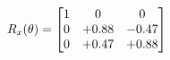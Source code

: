 \documentclass[preview]{standalone}
\begin{document}
\begin{align*}
\special{dvisvgm:raw <g id='unique000'>}R_{x}(\theta) = \begin{bmatrix}1 & 0 & 0 \\0 & +0.88 & -0.47 \\0 & +0.47 & +0.88\end{bmatrix}\special{dvisvgm:raw </g>}
\end{align*}
\end{document}
